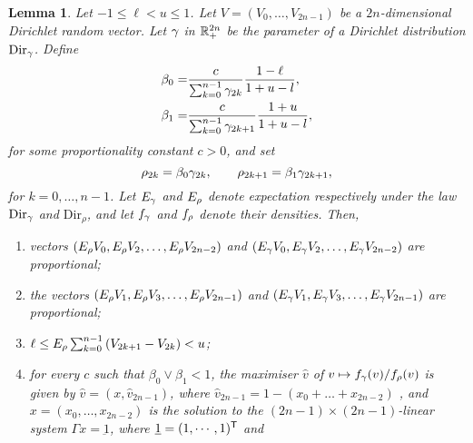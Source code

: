 \documentclass[10pt, article,table]{article}
\newtheorem{lemma}[thm]{Lemma}
\begin{document}
\begin{lemma}\label{lemma.proposal_dirparam}
 Let  $-1\leq \ell < u \leq 1$. Let $V=(V_0,\dots,V_{2n-1})$ be a $2n$-dimensional Dirichlet random vector. Let $\dirparam$ in $\R_{+}^{2n}$ be the parameter of a Dirichlet distribution $\text{Dir}_{\dirparam}$. Define
 \begin{equation*}
  \begin{split}
   \beta_0 = &
   \frac{c}{\sum_{k=0}^{n-1}\dirparam_{2k}}
   \frac{1-\ell}{1+u-l}, 
 \\
 \beta_1 = &
   \frac{c}{\sum_{k=0}^{n-1}\dirparam_{2k+1}}
   \frac{1+u}{1+u-l}, 
 \end{split}
 \end{equation*}
 for some proportionality constant $c>0$, and set 
 \begin{equation*}
  \rho_{2k} = \beta_0 \dirparam_{2k}, \qquad 
  \rho_{2k+1} = \beta_1 \dirparam_{2k+1}, 
 \end{equation*}
for $k=0,\dots,n-1$. Let $\Expectation_\dirparam$ and $\Expectation_\rho$ denote expectation respectively under the law $\text{Dir}_{\dirparam}$ and $\text{Dir}_{\rho}$, and let $\dirichletDensity[\dirparam]$ and $\dirichletDensity[\rho]$ denote their densities. Then,
\begin{enumerate}[label={\roman{*}.}, ref={\ref{lemma.proposal_dirparam}.\roman{*}}]
 \item \label{lemma.proposal_dirparam.proportional_even} vectors $(\Expectation_\rho V_{0}, \Expectation_\rho V_{2}, \dots , \Expectation_\rho V_{2n-2} )$ and $(\Expectation_\dirparam V_{0}, \Expectation_\dirparam V_{2}, \dots , \Expectation_\dirparam V_{2n-2} )$ are proportional;
 \item \label{lemma.proposal_dirparam.proportional_odd}the vectors $(\Expectation_\rho V_{1}, \Expectation_\rho V_{3}, \dots , \Expectation_\rho V_{2n-1} )$ and $(\Expectation_\dirparam V_{1}, \Expectation_\dirparam V_{3}, \dots , \Expectation_\dirparam V_{2n-1} )$ are proportional;
 \item  \label{lemma.proposal_dirparam.expectation} $\ell \leq \Expectation_{\rho} \sum_{k=0}^{n-1} \left( V_{2k+1} - V_{2k} \right) < u $;
 \item\label{lemma.proposal_dirparam.maximiser} for every $c$ such that $\beta_0 \vee \beta_1 < 1$, the maximiser $\hat{v}$ of $v\mapsto \dirichletDensity[\dirparam](v)/\dirichletDensity[\rho](v)$ is given by $\hat{v} = (x,\hat{v}_{2n-1})$, where $\hat{v}_{2n-1} = 1- (x_{0} + \dots + x_{2n-2})$ , and $x=(x_0,\dots,x_{2n-2})$ is the solution to the $(2n-1)\times(2n-1)$-linear system $\Gamma x = \underbar{1}$, where $\underbar{1} = (1,\cdots,1)\transpose$ and 

\end{enumerate}
\end{lemma}
\end{document}
